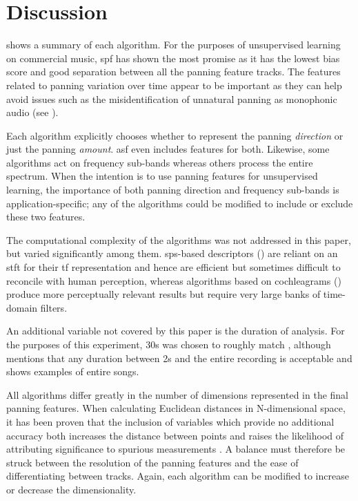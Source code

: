 \documentclass[twoside,a4paper]{article}
\begin{document}
\section{Discussion}
\label{sec:discussion}

 shows a summary of each algorithm. For the purposes of unsupervised learning on commercial music, \gls{spf} has shown the most promise as it has the lowest bias score and good separation between all the panning feature tracks. The features related to panning variation over time appear to be important as they can help avoid issues such as the misidentification of unnatural panning as monophonic audio (see ).

Each algorithm explicitly chooses whether to represent the panning \emph{direction} or just the panning \emph{amount}. \gls{asf} even includes features for both. Likewise, some algorithms act on frequency sub-bands whereas others process the entire spectrum. When the intention is to use panning features for unsupervised learning, the importance of both panning direction and frequency sub-bands is application-specific; any of the algorithms could be modified to include or exclude these two features.

The computational complexity of the algorithms was not addressed in this paper, but varied significantly among them. \gls{sps}-based descriptors (\cite{tzanetakisStereoPanningFeatures2007,gomezMusicSimilaritySystems2008}) are reliant on an \gls{stft} for their \gls{tf} representation and hence are efficient but sometimes difficult to reconcile with human perception, whereas algorithms based on cochleagrams (\cite{tardieuProductionEffectAudio2011}) produce more perceptually relevant results but require very large banks of time-domain filters.

An additional variable not covered by this paper is the duration of analysis. For the purposes of this experiment, 30s was chosen to roughly match \cite{tzanetakisStereoPanningFeatures2007}, although \cite{gomezMusicSimilaritySystems2008} mentions that any duration between 2s and the entire recording is acceptable and \cite{tardieuProductionEffectAudio2011} shows examples of entire songs. 


All algorithms differ greatly in the number of dimensions represented in the final panning features. When calculating Euclidean distances in N-dimensional space, it has been proven that the inclusion of variables which provide no additional accuracy both increases the distance between points and raises the likelihood of attributing significance to spurious measurements \cite{thireyDistributionEuclideanDistances2015}. A balance must therefore be struck between the resolution of the panning features and the ease of differentiating between tracks. Again, each algorithm can be modified to increase or decrease the dimensionality. 
\end{document}
